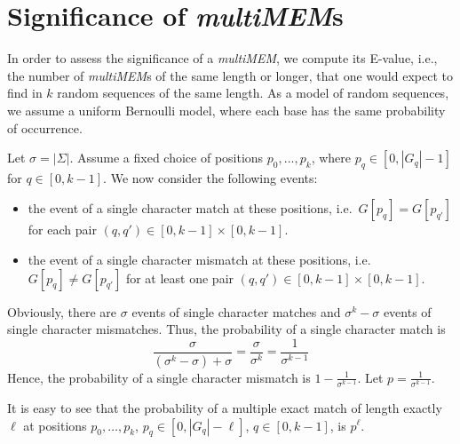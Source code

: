 \documentclass[12pt]{article}
\newcommand{\Size}[1]{|#1|}
\newcommand{\Subchar}[2]{#1[#2]}
\newcommand{\MMEM}[0]{\textit{multiMEM}\xspace}
\begin{document}
\section{Significance of \MMEM{s}}\label{MMEMevalue}
In order to assess the significance of a \MMEM,
we compute its E-value, i.e., the number of \MMEM{s} of
the same length or longer, that one would expect to find in 
\(k\) random sequences of the same length.
As a model of random sequences, we assume a uniform Bernoulli
model, where each base has the same probability of occurrence.

Let \(\sigma=\Size{\Sigma}\). Assume a fixed
choice of positions \(p_{0},\ldots,p_{k}\), where
\(p_{q}\in[0,\Size{G_{q}}-1]\) for \(q\in[0,k-1]\). We now 
consider the following events:
\begin{itemize}
\item
the event of a single character match at these positions, i.e.\
\(\Subchar{G}{p_{q}}=\Subchar{G}{p_{q'}}\) for each pair 
\((q,q')\in[0,k-1]\times[0,k-1]\).
\item
the event of a single character mismatch at these positions, i.e.\
\(\Subchar{G}{p_{q}}\neq\Subchar{G}{p_{q'}}\) for at least one pair 
\((q,q')\in[0,k-1]\times[0,k-1]\).
\end{itemize}
Obviously, there are \(\sigma\) events of single character matches and 
\(\sigma^{k}-\sigma\) events of single character mismatches.
Thus, the probability of a single character match is 
\[
\frac{\sigma}{(\sigma^{k}-\sigma)+\sigma}
    =\frac{\sigma}{\sigma^{k}}
    =\frac{1}{\sigma^{k-1}}
\]
Hence, the probability of a single character mismatch is 
\(1-\frac{1}{\sigma^{k-1}}\). Let \(p=\frac{1}{\sigma^{k-1}}\). 

It is easy to see that the probability of a
multiple exact match of length exactly \(\ell\)
at positions \(p_{0},\ldots,p_{k}\), 
\(p_{q}\in[0,\Size{G_{q}}-\ell]\), \(q\in[0,k-1]\),
is \(p^{\ell}\).
\end{document}
